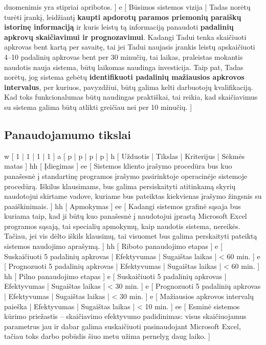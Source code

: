 {    duomenimis yra stipriai apribotos.
  ]
  e [ Būsimos sistemos vizija
  | 
    Tadas norėtų turėti įrankį, leidžiantį \textbf{kaupti apdorotų paramos priemonių paraiškų
    istorinę informaciją} ir kuris leistų tą informaciją panaudoti \textbf{padalinių apkrovų 
    skaičiavimui ir prognozavimui}.
    Kadangi Tadui tenka skaičiuoti apkrovas bent kartą per savaitę, tai jei Tadui naujasis 
    įrankis leistų apskaičiuoti 4–10 padalinių apkrovas bent per 30 minučių, 
    tai laikas, praleistas mokantis naudotis nauja sistema, būtų laikomas naudinga investicija.
    Taip pat, Tadas norėtų, jog sistema gebėtų \textbf{identifikuoti padalinių
    mažiausios apkrovos intervalus}, per kuriuos, pavyzdžiui, būtų galima kelti darbuotojų
    kvalifikaciją. Kad toks funkcionalumas būtų naudingas praktiškai, tai 
    reikia, kad skaičiavimus su sistema galima būtų atlikti greičiau
    nei per 10 minučių.
  ]
}

\subsection{Panaudojamumo tikslai}
\xtable
{
  w [ 1 | 1 | 1 | 1 ]
  a [ p | p | p | p ]
  h [ Užduotis | Tikslas | Kriterijus | Sėkmės matas ]
  hh [ Įdiegimas ]
  ee 
  [ 
    Sistemos kliento įrašymo procedūra bus kuo panašesnė į
    standartinę programos įrašymo pasirinktoje operacinėje sistemoje
    procedūrą. Iškilus klausimams, bus galima persiskaityti
    atitinkamą skyrių naudotojui skirtame vadove, kuriame bus
    pateiktas kiekvienas įrašymo žingsnis su paaiškinimais.
  ]
  hh [ Apmokymas ]
  ee 
  [ 
    Kadangi sistemos grafinė sąsaja bus kuriama taip, kad ji būtų kuo
    panašesnė į naudotojui įprastą Microsoft Excel programos sąsają,
    tai specialių apmokymų, kaip naudotis sistema, nereikės. Tačiau,
    jei vis dėlto iškils klausimų, tai visuomet bus galima perskaityti
    pateiktą sistemos naudojimo aprašymą.
  ]
  hh [ Riboto panaudojimo etapas ]
  e [ Suskaičiuoti 5 padalinių apkrovas | Efektyvumas | Sugaištas laikas | < 60 min. ]
  e [ Prognozuoti 5 padalinių apkrovas | Efektyvumas | Sugaištas laikas | < 60 min. ]
  hh [ Pilno panaudojimo etapas ]
  e [ Suskaičiuoti 5 padalinių apkrovas | Efektyvumas | Sugaištas laikas | < 30 min. ]
  e [ Prognozuoti 5 padalinių apkrovas | Efektyvumas | Sugaištas laikas | < 30 min. ]
  e [ Mažiausios apkrovos intervalų paieška | Efektyvumas | Sugaištas laikas | < 10 min. ]
  ee 
  [ 
    Esminė sistemos kūrimo priežastis – skaičiavimo efektyvumo padidinimas: visus skaičiuojamus
    parametrus jau ir dabar galima suskaičiuoti pasinaudojant Microsoft Excel, tačiau toks
    darbo pobūdis šiuo metu užima pernelyg daug laiko.
  ]
}

